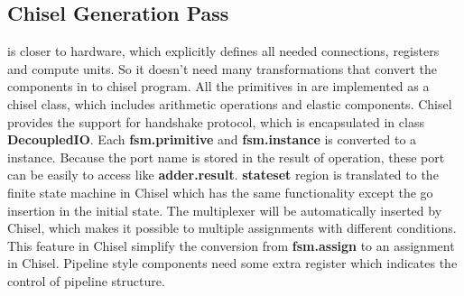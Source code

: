 \subsection{Chisel Generation Pass}
\fsm{} is closer to hardware, which explicitly defines all needed connections, registers and compute units. So it doesn't need many transformations that convert the components in \fsm{} to chisel program. All the primitives in \fsm{} are implemented as a chisel class, which includes arithmetic operations and elastic components. Chisel provides the support for handshake protocol, which is encapsulated in class \textbf{DecoupledIO}. Each \textbf{fsm.primitive} and \textbf{fsm.instance} is converted to a instance. Because the port name is stored in the result of operation, these port can be easily to access like \textbf{adder.result}. \textbf{stateset} region is translated to the finite state machine in Chisel which has the same functionality except the go insertion in the initial state. The multiplexer will be automatically inserted by Chisel, which makes it possible to multiple assignments with different conditions. This feature in Chisel simplify the conversion from \textbf{fsm.assign} to an assignment in Chisel. Pipeline style components need some extra register which indicates the control of pipeline structure.

\fi